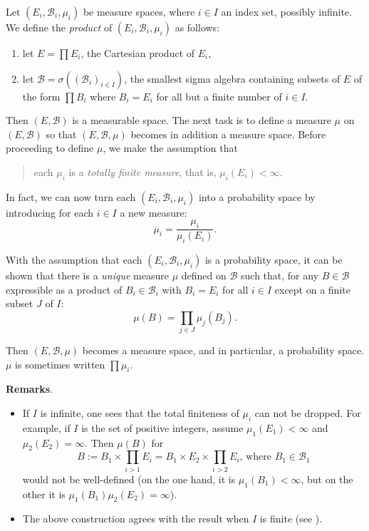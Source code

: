 \documentclass[12pt]{article}
\begin{document}
Let $(E_i,\mathcal{B}_i,\mu_i)$ be measure spaces, where $i\in I$ an index set, possibly infinite.  We define the \emph{product} of $(E_i,\mathcal{B}_i,\mu_i)$ as follows:
\begin{enumerate}
\item let $E=\prod E_i$, the Cartesian product of $E_i$,
\item let $\mathcal{B}=\sigma((\mathcal{B}_i)_{i\in I})$, the smallest sigma algebra containing subsets of $E$ of the form $\prod B_i$ where $B_i=E_i$ for all but a finite number of $i\in I$.
\end{enumerate}

Then $(E,\mathcal{B})$ is a measurable space.  The next task is to define a measure $\mu$ on $(E,\mathcal{B})$ so that $(E,\mathcal{B},\mu)$ becomes in addition a measure space.  Before proceeding to define $\mu$, we make the assumption that \begin{quote} each $\mu_i$ is a \emph{totally finite measure}, that is, $\mu_i(E_i)< \infty$.\end{quote}  In fact, we can now turn each $(E_i,\mathcal{B}_i,\mu_i)$ into a probability space by introducing for each $i\in I$ a new measure: $$\overline{\mu}_i=\frac{\mu_i}{\mu_i(E_i)}.$$

With the assumption that each $(E_i,\mathcal{B}_i,\mu_i)$ is a probability space, it can be shown that there is a \emph{unique} measure $\mu$ defined on $\mathcal{B}$ such that, for any $B\in \mathcal{B}$ expressible as a product of $B_i\in \mathcal{B}_i$ with $B_i=E_i$ for all $i\in I$ except on a finite subset $J$ of $I$:
$$\mu(B)=\prod_{j\in J} \mu_j(B_j).$$

Then $(E,\mathcal{B},\mu)$ becomes a measure space, and in particular, a probability space.  $\mu$ is sometimes written $\prod \mu_i$.

\textbf{Remarks}.
\begin{itemize}
\item If $I$ is infinite, one sees that the total finiteness of $\mu_i$ can not be dropped.  For example, if $I$ is the set of positive integers, assume $\mu_1(E_1)<\infty$ and $\mu_2(E_2)=\infty$.  Then $\mu(B)$ for $$B:=B_1\times \prod_{i>1}E_i = B_1\times E_2 \times \prod_{i>2}E_i \mbox{, where }B_1\in \mathcal{B}_1$$ would not be well-defined (on the one hand, it is $\mu_1(B_1)<\infty$, but on the other it is $\mu_1(B_1)\mu_2(E_2)=\infty$).
\item The above construction agrees with the result when $I$ is finite (see ).
\end{itemize}
\end{document}
